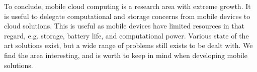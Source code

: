 To conclude, mobile cloud computing is a research area with extreme growth.
It is useful to delegate computational and storage concerns from mobile devices to cloud solutions.
This is useful as mobile devices have limited resources in that regard, e.g. storage, battery life, and computational power.
Various state of the art solutions exist, but a wide range of problems still exists to be dealt with.
We find the area interesting, and is worth to keep in mind when developing mobile solutions.